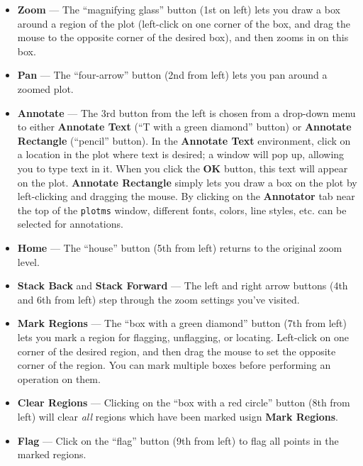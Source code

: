 \begin{itemize}

\item {\bf Zoom} --- The ``magnifying glass'' button (1st on left) lets you draw a box around a region of the plot (left-click on one corner of the box, and drag the mouse to the opposite corner of the desired box), and then zooms in on this box.  

\item {\bf Pan} --- The ``four-arrow'' button (2nd from left) lets you pan around a zoomed plot.

\item {\bf Annotate} --- The 3rd button from the left is chosen from a drop-down menu to either {\bf Annotate Text} (``T with a green diamond'' button) or {\bf Annotate Rectangle} (``pencil'' button). In the {\bf Annotate Text} environment, click on a location in the plot where text is desired; a window will pop up, allowing you to type text in it. When you click the {\bf OK} button, this text will appear on the plot. {\bf Annotate Rectangle} simply lets you draw a box on the plot by left-clicking and dragging the mouse. By clicking on the {\bf Annotator} tab near the top of the {\tt plotms} window, different fonts, colors, line styles, etc. can be selected for annotations. 

\item {\bf Home} --- The ``house'' button (5th from left) returns to the original zoom level.

\item {\bf Stack Back} and {\bf Stack Forward} --- The left and right arrow buttons (4th and 6th from left) step through the zoom settings you've visited.

\item {\bf Mark Regions} --- The ``box with a green diamond'' button (7th from left) lets you mark a region for flagging, unflagging, or locating. Left-click on one corner of the desired region, and then drag the mouse to set the opposite corner of the region. You can mark multiple boxes before performing an operation on them.  

\item {\bf Clear Regions} --- Clicking on the ``box with a red circle'' button (8th from left) will clear {\it all} regions which have been marked usign {\bf Mark Regions}.

\item {\bf Flag} --- Click on the ``flag'' button (9th from left) to flag all points in the marked regions.


\end{itemize}
